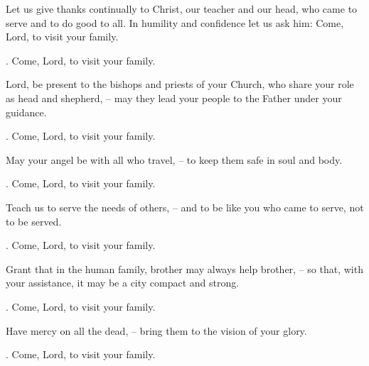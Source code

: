 \lettrine[loversize=0.15,lines=2]{L}{}et us give thanks continually to Christ, our teacher and our head, who came to serve and to do good to all. In humility and confidence let us ask him: Come, Lord, to visit your family.
\par \Rbar. Come, Lord, to visit your family.

Lord, be present to the bishops and priests of your Church, who share your role as head and shepherd,
– may they lead your people to the Father under your guidance.
\par \Rbar. Come, Lord, to visit your family.

May your angel be with all who travel,
– to keep them safe in soul and body.
\par \Rbar. Come, Lord, to visit your family.

Teach us to serve the needs of others,
– and to be like you who came to serve, not to be served.
\par \Rbar. Come, Lord, to visit your family.

Grant that in the human family, brother may always help brother,
– so that, with your assistance, it may be a city compact and strong.
\par \Rbar. Come, Lord, to visit your family.

Have mercy on all the dead,
– bring them to the vision of your glory.
\par \Rbar. Come, Lord, to visit your family.
